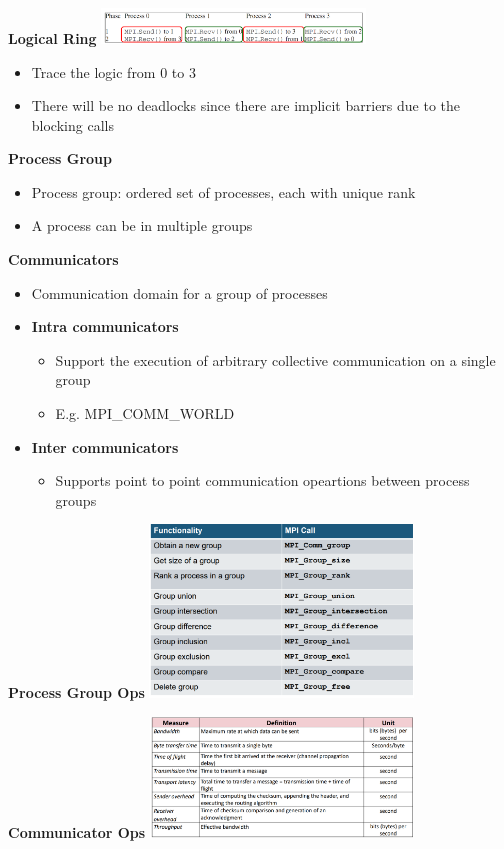 \documentclass[10pt, landscape]{article}
\begin{document}
\begin{multicols}{4}
\textbf{Logical Ring}
\includegraphics*[width=7cm]{deadlock_free_logical_ring.png}
\begin{itemize}
    \item Trace the logic from 0 to 3
    \item There will be no deadlocks since there are implicit barriers due to the blocking calls
\end{itemize}

\textbf{Process Group}
\begin{itemize}
    \item Process group: ordered set of processes, each with unique rank 
    \item A process can be in multiple groups
\end{itemize}

\textbf{Communicators}
\begin{itemize}
    \item Communication domain for a group of processes 
    \item \textbf{Intra communicators}
    \begin{itemize}
        \item Support the execution of arbitrary collective communication on a single group
        \item E.g. MPI\_COMM\_WORLD
    \end{itemize}
    \item \textbf{Inter communicators}
    \begin{itemize}
        \item Supports point to point communication opeartions between process groups 
    \end{itemize}
\end{itemize}

\textbf{Process Group Ops}
\includegraphics*[width=7cm]{process_grp_op.png}

\textbf{Communicator Ops}
\includegraphics*[width=7cm]{communication.png}


\end{multicols}
\end{document}
